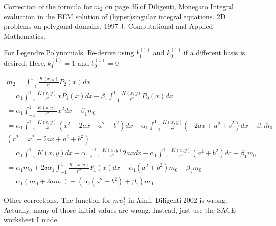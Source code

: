 \documentclass[a4paper,12pt]{article}
\begin{document}
 

Correction of the formula for $\bar{m}_2$ on page 35 of Diligenti, Monegato
Integral evaluation in the BEM solution of (hyper)singular integral 
equations. 2D problems on polygonal domains. 1997 J. Computational and 
Applied Mathematics.

For Legendre Polynomials. Re-derive using $k_1^{(1)}$ and $k_0^{(1)}$ if a 
different basis is desired. Here, $k_1^{(1)} = 1$ and $k_0^{(1)} = 0$

\begin{align}
    \bar{m}_2 = \int_{-1}^{1} \frac{K(x,y)}{r^2} P_2(x) dx \\
    = \alpha_1 \int_{-1}^{1} \frac{K(x,y)}{r^2} x P_1(x) dx - \beta_1 \int_{-1}^{1} \frac{K(x,y)}{r^2} P_0(x) dx \\
    = \alpha_1 \int_{-1}^{1} \frac{K(x,y)}{r^2} x^2  dx - \beta_1 \bar{m}_0   \\
    = \alpha_1 \int_{-1}^{1} \frac{K(x,y)}{r^2} (x^2 - 2ax + a^2 + b^2) dx - 
      \alpha_1 \int_{-1}^{1} \frac{K(x,y)}{r^2} (-2ax + a^2 + b^2)  dx -
      \beta_1 \bar{m}_0 \\
    (r^2 = x^2 - 2ax + a^2 + b^2) \\
    = \alpha_1 \int_{-1}^{1} K(x,y) dx +
      \alpha_1 \int_{-1}^{1} \frac{K(x,y)}{r^2} 2ax dx -
      \alpha_1 \int_{-1}^{1} \frac{K(x,y)}{r^2} (a^2 + b^2) dx -
      \beta_1 \bar{m}_0 \\
    = \alpha_1 m_0 +
      2 a \alpha_1 \int_{-1}^{1} \frac{K(x,y)}{r^2} P_1(x) dx -
      \alpha_1 (a^2 + b^2) \bar{m}_0 -
      \beta_1 \bar{m}_0 \\
    = \alpha_1 (m_0 + 2 a \bar{m}_1) - 
    (\alpha_1(a^2 + b^2) + \beta_1) \bar{m}_0
\end{align}

Other corrections. The function for $mu_3^1$ in Aimi, Diligenti 2002 is wrong. Actually, many of those initial values are wrong. Instead, just use the SAGE worksheet I made.
\end{document}
